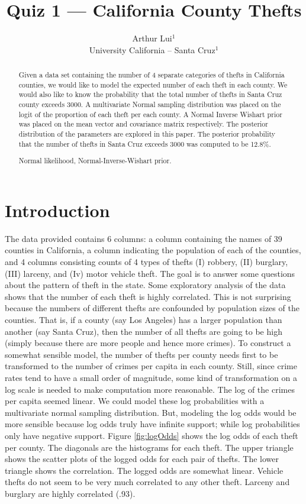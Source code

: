 \documentclass{../../tex_template/asaproc}
\title{Quiz 1 --- California County Thefts}
\author{
  Arthur Lui$^1$\\
  University California -- Santa Cruz$^1$\\
}
\begin{document}
\maketitle


\begin{abstract}
Given a data set containing the number of 4 separate categories of thefts in
California counties, we would like to model the expected number of each theft
in each county. We would also like to know the probability that the total
number of thefts in Santa Cruz county exceeds 3000. A multivariate Normal
sampling distribution was placed on the logit of the proportion of each theft
per each county. A Normal Inverse Wishart prior was placed on the mean vector
and covariance matrix respectively. The posterior distribution of the parameters
are explored in this paper. The posterior probability that the number of thefts 
in Santa Cruz exceeds 3000 was computed to be 12.8\%.
\begin{keywords}
Normal likelihood, Normal-Inverse-Wishart prior.
\end{keywords}
\end{abstract}


\section{Introduction}
The data provided contains 6 columns: a column containing the names of 39
counties in California, a column indicating the population of each of the
counties, and 4 columns consisting counts of 4 types of thefts (I) robbery,
(II) burglary, (III) larceny, and (Iv) motor vehicle theft. The goal is to
answer some questions about the pattern of theft in the state. Some exploratory
analysis of the data shows that the number of each theft is highly correlated.
This is not surprising because the numbers of different thefts are confounded
by population sizes of the counties. That is, if a county (say Los Angeles) has
a larger population than another (say Santa Cruz), then the number of all
thefts are going to be high (simply because there are more people and hence
more crimes). To construct a somewhat sensible model, the number of thefts per
county needs first to be transformed to the number of crimes per capita in each
county. Still, since crime rates tend to have a small order of magnitude, some
kind of transformation on a log scale is needed to make computation more
reasonable. The log of the crimes per capita seemed linear. We could model
these log probabilities with a multivariate normal sampling distribution. But,
modeling the log odds would be more sensible because log odds truly have infinite
support; while log probabilities only have negative support. Figure \ref{fig:logOdds}
shows the log odds of each theft per county. The diagonals are the histograms for 
each theft. The upper triangle shows the scatter plots of the logged odds for each 
pair of thefts. The lower triangle shows the correlation. The logged odds
are somewhat linear. Vehicle thefts do not seem to be very much correlated to any
other theft. Larceny and burglary are highly correlated (.93).
\end{document}
